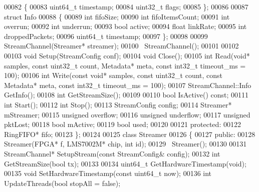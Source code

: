 \begin{DoxyCode}
00082     \{
00083         uint64\_t timestamp;
00084         uint32\_t flags;
00085     \};
00086     
00087     \textcolor{keyword}{struct }Info
00088     \{
00089         \textcolor{keywordtype}{int} fifoSize;
00090         \textcolor{keywordtype}{int} fifoItemsCount;
00091         \textcolor{keywordtype}{int} overrun;
00092         \textcolor{keywordtype}{int} underrun;
00093         \textcolor{keywordtype}{bool} active;
00094         \textcolor{keywordtype}{float} linkRate;
00095         \textcolor{keywordtype}{int} droppedPackets;
00096         uint64\_t timestamp;
00097     \};
00098     
00099     StreamChannel(Streamer* streamer);
00100     ~StreamChannel();
00101     
00102     
00103     \textcolor{keywordtype}{void} Setup(StreamConfig conf);
00104     \textcolor{keywordtype}{void} Close();
00105     \textcolor{keywordtype}{int} Read(\textcolor{keywordtype}{void}* samples, \textcolor{keyword}{const} uint32\_t count, Metadata* meta, \textcolor{keyword}{const} int32\_t 
      timeout_ms = 100);
00106     \textcolor{keywordtype}{int} Write(\textcolor{keyword}{const} \textcolor{keywordtype}{void}* samples, \textcolor{keyword}{const} uint32\_t count, \textcolor{keyword}{const} Metadata* meta, \textcolor{keyword}{const} int32\_t 
      timeout_ms = 100);
00107     StreamChannel::Info GetInfo();
00108     \textcolor{keywordtype}{int} GetStreamSize();
00109 
00110     \textcolor{keywordtype}{bool} IsActive() \textcolor{keyword}{const};
00111     \textcolor{keywordtype}{int} Start();
00112     \textcolor{keywordtype}{int} Stop();
00113     StreamConfig config;
00114     Streamer* mStreamer;
00115     \textcolor{keywordtype}{unsigned} overflow;
00116     \textcolor{keywordtype}{unsigned} underflow;
00117     \textcolor{keywordtype}{unsigned} pktLost;
00118     \textcolor{keywordtype}{bool} mActive;
00119     \textcolor{keywordtype}{bool} used;
00120        
00121 \textcolor{keyword}{protected}:
00122     RingFIFO* fifo;  
00123 \};
00124     
00125 \textcolor{keyword}{class }Streamer
00126 \{
00127 \textcolor{keyword}{public}:
00128     Streamer(FPGA* f, LMS7002M* chip, \textcolor{keywordtype}{int} \textcolor{keywordtype}{id});
00129     ~Streamer();
00130 
00131     StreamChannel* SetupStream(\textcolor{keyword}{const} StreamConfig& config);
00132     \textcolor{keywordtype}{int} GetStreamSize(\textcolor{keywordtype}{bool} tx);
00133 
00134     uint64\_t GetHardwareTimestamp(\textcolor{keywordtype}{void});
00135     \textcolor{keywordtype}{void} SetHardwareTimestamp(\textcolor{keyword}{const} uint64\_t now);
00136     \textcolor{keywordtype}{int} UpdateThreads(\textcolor{keywordtype}{bool} stopAll = \textcolor{keyword}{false});

\end{DoxyCode}
